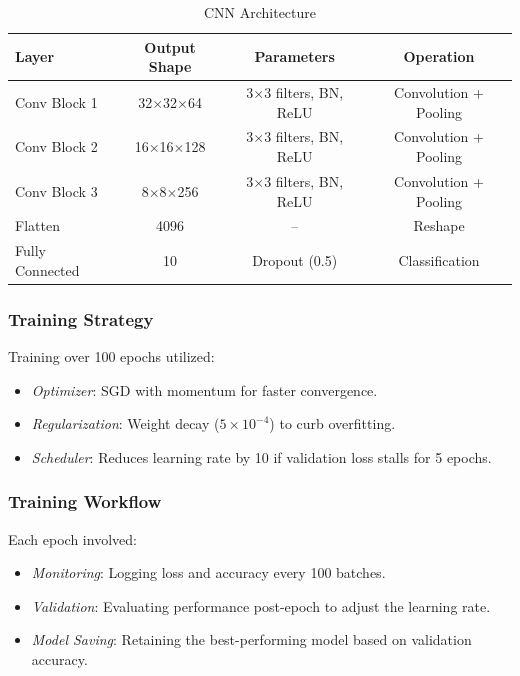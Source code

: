 \documentclass[UTF8]{report}
\theoremstyle{MyLineTheoremStyle} %
\theoremstyle{MyBlockTheoremStyle} %
\theoremstyle{MySubsubsectionStyle} %
\begin{document}
\begin{table}[h]
\centering
\caption{CNN Architecture}
\begin{tabular}{l c c c}
\toprule
\textbf{Layer} & \textbf{Output Shape} & \textbf{Parameters} & \textbf{Operation} \\
\midrule
Conv Block 1 & 32$\times$32$\times$64 & 3$\times$3 filters, BN, ReLU & Convolution + Pooling \\
Conv Block 2 & 16$\times$16$\times$128 & 3$\times$3 filters, BN, ReLU & Convolution + Pooling \\
Conv Block 3 & 8$\times$8$\times$256 & 3$\times$3 filters, BN, ReLU & Convolution + Pooling \\
Flatten & 4096 & -- & Reshape \\
Fully Connected & 10 & Dropout (0.5) & Classification \\
\bottomrule
\end{tabular}
\end{table}

\subsubsection{Training Strategy}

Training over 100 epochs utilized:

\begin{itemize}
    \item \textit{Optimizer}: SGD with momentum for faster convergence.
    \item \textit{Regularization}: Weight decay ($5 \times 10^{-4}$) to curb overfitting.
    \item \textit{Scheduler}: Reduces learning rate by 10 if validation loss stalls for 5 epochs.
\end{itemize}

\subsubsection{Training Workflow}

Each epoch involved:

\begin{itemize}
    \item \textit{Monitoring}: Logging loss and accuracy every 100 batches.
    \item \textit{Validation}: Evaluating performance post-epoch to adjust the learning rate.
    \item \textit{Model Saving}: Retaining the best-performing model based on validation accuracy.
\end{itemize}
\end{document}
